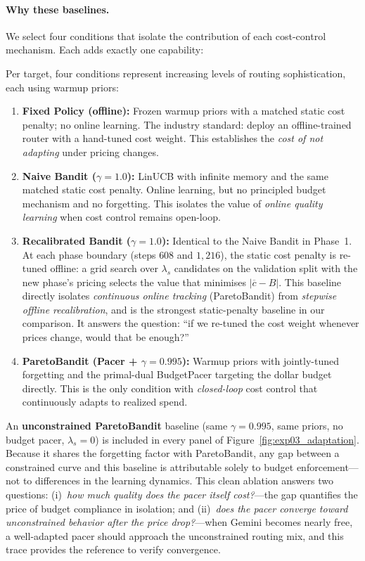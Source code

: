 \paragraph{Why these baselines.}
We select four conditions that isolate the contribution of each
cost-control mechanism.  Each adds exactly one capability:

\noindent
Per target, four conditions represent increasing levels of
routing sophistication, each using warmup priors:
\begin{enumerate}[nosep,leftmargin=*]
  \item \textbf{Fixed Policy (offline):}
    Frozen warmup priors with a matched static cost penalty;
    no online learning.  The industry standard: deploy an
    offline-trained router with a hand-tuned cost weight.
    This establishes the \emph{cost of not adapting} under
    pricing changes.
  \item \textbf{Naive Bandit ($\gamma{=}1.0$):}
    LinUCB with infinite memory and the same matched static
    cost penalty.  Online learning, but no principled budget
    mechanism and no forgetting.
    This isolates the value of \emph{online quality learning}
    when cost control remains open-loop.
  \item \textbf{Recalibrated Bandit ($\gamma{=}1.0$):}
    Identical to the Naive Bandit in Phase~1.  At each phase
    boundary (steps $608$ and $1{,}216$), the static cost penalty
    is re-tuned offline: a grid search over $\lambda_s$ candidates
    on the validation split with the new phase's pricing selects
    the value that minimises
    $|\overline{c} - B|$.  This baseline directly isolates
    \emph{continuous online tracking} (ParetoBandit) from
    \emph{stepwise offline recalibration}, and is the strongest
    static-penalty baseline in our comparison.
    It answers the question: ``if we re-tuned the cost weight
    whenever prices change, would that be enough?''
  \item \textbf{ParetoBandit (Pacer + $\gamma{=}0.995$):}
    Warmup priors with jointly-tuned forgetting and the
    primal-dual BudgetPacer targeting the dollar budget directly.
    This is the only condition with \emph{closed-loop} cost
    control that continuously adapts to realized spend.
\end{enumerate}

\noindent
An \textbf{unconstrained ParetoBandit} baseline (same $\gamma{=}0.995$,
same priors, no budget pacer, $\lambda_s{=}0$) is included in
every panel of Figure~\ref{fig:exp03_adaptation}.
Because it shares the forgetting factor with ParetoBandit, any gap
between a constrained curve and this baseline is attributable solely
to budget enforcement---not to differences in the learning dynamics.
This clean ablation answers two questions:
(i)~\emph{how much quality does the pacer itself cost?}---the gap
quantifies the price of budget compliance in isolation; and
(ii)~\emph{does the pacer converge toward unconstrained behavior
after the price drop?}---when Gemini becomes nearly free, a
well-adapted pacer should approach the unconstrained routing mix,
and this trace provides the reference to verify convergence.


